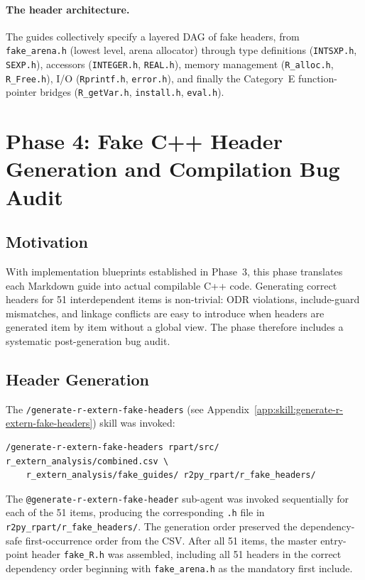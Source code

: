 \documentclass[12pt]{article}
\newcommand{\skillapp}[2]{\texttt{/#1} (see Appendix~\ref{app:skill:#2})}
\begin{document}
\paragraph{The header architecture.} The guides collectively specify a layered DAG of fake headers, from \texttt{fake\_arena.h} (lowest level, arena allocator) through type definitions (\texttt{INTSXP.h}, \texttt{SEXP.h}), accessors (\texttt{INTEGER.h}, \texttt{REAL.h}), memory management (\texttt{R\_alloc.h}, \texttt{R\_Free.h}), I/O (\texttt{Rprintf.h}, \texttt{error.h}), and finally the Category~E function-pointer bridges (\texttt{R\_getVar.h}, \texttt{install.h}, \texttt{eval.h}).

\section{Phase 4: Fake C++ Header Generation and Compilation Bug Audit}
\label{sec:phase4}

\subsection{Motivation}

With implementation blueprints established in Phase~3, this phase translates each Markdown guide into actual compilable C++ code. Generating correct headers for 51 interdependent items is non-trivial: ODR violations, include-guard mismatches, and linkage conflicts are easy to introduce when headers are generated item by item without a global view. The phase therefore includes a systematic post-generation bug audit.

\subsection{Header Generation}

The \skillapp{generate-r-extern-fake-headers}{generate-r-extern-fake-headers} skill was invoked:
\begin{lstlisting}[style=skill]
/generate-r-extern-fake-headers rpart/src/ r_extern_analysis/combined.csv \
    r_extern_analysis/fake_guides/ r2py_rpart/r_fake_headers/
\end{lstlisting}

The \texttt{@generate-r-extern-fake-header} sub-agent was invoked sequentially for each of the 51 items, producing the corresponding \texttt{.h} file in \texttt{r2py\_rpart/r\_fake\_headers/}. The generation order preserved the dependency-safe first-occurrence order from the CSV. After all 51 items, the master entry-point header \texttt{fake\_R.h} was assembled, including all 51 headers in the correct dependency order beginning with \texttt{fake\_arena.h} as the mandatory first include.
\end{document}
